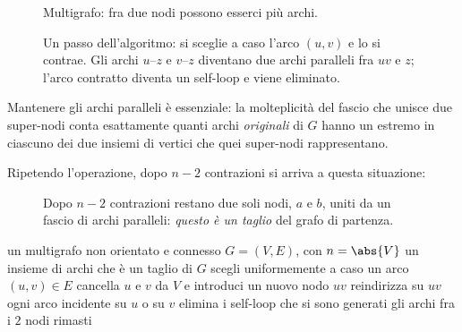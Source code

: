 \begin{figure}[H]
  \centering
  
  \caption{Multigrafo: fra due nodi possono esserci più archi.}
  \label{fig:multigrafo-archi-paralleli}
\end{figure}

\begin{figure}[H]
  \centering
  
  \caption{Un passo dell'algoritmo: si sceglie a caso l'arco $(u,v)$ e lo si contrae. Gli
  archi $u$--$z$ e $v$--$z$ diventano due archi paralleli fra $uv$ e $z$; l'arco contratto
  diventa un self-loop e viene eliminato.}
  \label{fig:karger-contrazione}
\end{figure}

Mantenere gli archi paralleli è essenziale: la molteplicità del fascio che unisce due
super-nodi conta esattamente quanti archi \emph{originali} di $G$ hanno un estremo in
ciascuno dei due insiemi di vertici che quei super-nodi rappresentano.

Ripetendo l'operazione, dopo $n-2$ contrazioni si arriva a questa situazione:

\begin{figure}[H]
  \centering
  
  \caption{Dopo $n-2$ contrazioni restano due soli nodi, $a$ e $b$, uniti da un fascio di
  archi paralleli: \emph{questo è un taglio} del grafo di partenza.}
  \label{fig:karger-due-nodi-taglio}
\end{figure}

\begin{algorithm}[H]
\caption{\contract: una singola esecuzione dell'algoritmo randomizzato di Karger per il \mincut}
\label{alg:contract}
\begin{algorithmic}[1]
  \Require un multigrafo non orientato e connesso $G=(V,E)$, con $n=\abs{V}$
  \Ensure un insieme di archi che è un taglio di $G$
    \State scegli uniformemente a caso un arco $(u,v)\in E$
    \State cancella $u$ e $v$ da $V$ e introduci un nuovo nodo $uv$
    \State reindirizza su $uv$ ogni arco incidente su $u$ o su $v$
    \State elimina i self-loop che si sono generati
  \EndFor
  \State \Return gli archi fra i $2$ nodi rimasti
\end{algorithmic}
\end{algorithm}

